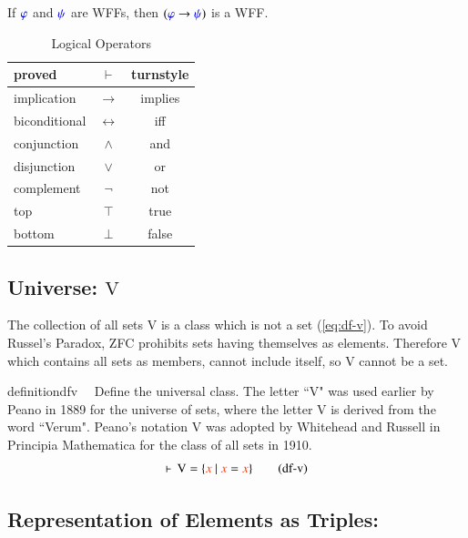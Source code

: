 \pn If $\mw{\varphi}$ and $\mw{\psi}$ are WFFs, then $(\mw{\varphi}\rightarrow\mw{\psi})$ is a WFF.
\begin{table}[htp]
\caption{Logical Operators}
\begin{center}
\begin{tabular}{|l|c|c|}
\hline
proved%
 & $\vdash$ & turnstyle \\ \hline
implication & $\rightarrow$ & implies \\ \hline
biconditional & $\leftrightarrow$ & iff \\ \hline
conjunction & $\wedge$ & and \\ \hline
disjunction & $\vee$ & or \\ \hline
complement & $\lnot$ & not \\ \hline
top & $\top$ & true \\ \hline
bottom & $\bot$ & false \\ \hline
\end{tabular}
\end{center}
\label{table:logicaloperators}
\end{table}%


\subsection{Universe:  $\mathrm{V}$}

\pn The collection of all sets $\mathrm{V}$ is a class which is not a set (\ref{eq:df-v}). 
To avoid Russel's Paradox, ZFC prohibits sets having themselves as elements.  Therefore $\mathrm{V}$ which contains all sets as members, cannot include itself, so $\mathrm{V}$ cannot be a set.


\begin{restatable}{definition}{dfv}~~ Define the universal class.   The letter ``V" was used earlier by Peano in 1889 for the
     universe of sets, where the letter V is derived from the word ``Verum".
     Peano's notation V was adopted by Whitehead and Russell in Principia
     Mathematica for the class of all sets in 1910.  
\begin{align}
\vdash \,\mathrm{V} = \{ \msc{x}~\vert~\msc{x} = \msc{x}
    \}\label{eq:df-v}\tag{df-v}
\end{align}
\end{restatable}

\subsection{Representation of Elements as Triples:}

